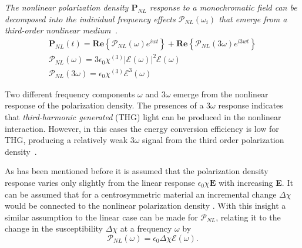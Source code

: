 \begin{tcolorbox}[title=Nonlinear Polarization Density]
\emph{The nonlinear polarization density $\textbf{P}_{NL}$ response to a monochromatic field can be decomposed into the individual frequency effects $\mathcal{P}_{NL}(\omega_i)$ that emerge from a third-order nonlinear medium~\cite{FundPhoto}.}
\begin{subequations}
\begin{gather}
\textbf{P}_{NL}(t)= \textbf{Re}\left\{\mathcal{P}_{NL}(\omega)e^{iwt}\right\}+\textbf{Re}\left\{\mathcal{P}_{NL}(3\omega)e^{i3wt}\right\}\\
\mathcal{P}_{NL}(\omega)=3\epsilon_0\chi^{(3)}|\mathcal{E}(\omega)|^2\mathcal{E}(\omega)\label{eq:wres}\\
\mathcal{P}_{NL}(3\omega)=\epsilon_0\chi^{(3)}\mathcal{E}^3(\omega)
\end{gather}
\label{eq:PNL}
\end{subequations}
\end{tcolorbox}

Two different frequency components $\omega$ and $3\omega$ emerge from the nonlinear response of the polarization density. The presences of a $3\omega$ response indicates that \emph{third-harmonic generated} (THG) light can be produced in the nonlinear interaction. However, in this cases the energy conversion efficiency is low for THG, 
producing a relatively weak $3\omega$ signal from the third order polarization density~\cite{FundPhoto}.
 
As has been mentioned before it is assumed that the polarization density response varies only slightly from the linear response $\epsilon_0\chi\textbf{E}$ with increasing \textbf{E}. It can be assumed that for a centrosymmetric material  an incremental change $\Delta\chi$ would be connected to the nonlinear polarization density \cite{FundPhoto,FiberAgrawal}. With this insight a similar assumption to the linear case can be made for $\mathcal{P}_{NL}$, relating it to the change in the susceptibility $\Delta\chi$ at a frequency $\omega$ by 
\begin{equation}
\mathcal{P}_{NL}(\omega)=\epsilon_0\Delta\chi\mathcal{E}(\omega).\label{eq:incPE}
\end{equation}

